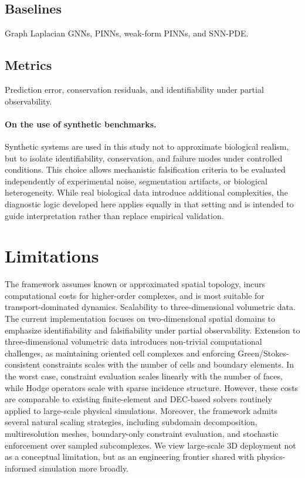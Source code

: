 \documentclass[10pt,article]{article}
\begin{document}
\subsection{Baselines}
Graph Laplacian GNNs, PINNs, weak-form PINNs, and SNN-PDE.

\subsection{Metrics}
Prediction error, conservation residuals, and identifiability under partial observability.

\paragraph{On the use of synthetic benchmarks.}
Synthetic systems are used in this study not to approximate biological realism, but to isolate identifiability, conservation, and failure modes under controlled conditions. This choice allows mechanistic falsification criteria to be evaluated independently of experimental noise, segmentation artifacts, or biological heterogeneity. While real biological data introduce additional complexities, the diagnostic logic developed here applies equally in that setting and is intended to guide interpretation rather than replace empirical validation.
\section{Limitations}

The framework assumes known or approximated spatial topology, incurs computational costs for higher-order complexes, and is most suitable for transport-dominated dynamics.
Scalability to three-dimensional volumetric data.
The current implementation focuses on two-dimensional spatial domains to emphasize identifiability and falsifiability under partial observability. Extension to three-dimensional volumetric data introduces non-trivial computational challenges, as maintaining oriented cell complexes and enforcing Green/Stokes-consistent constraints scales with the number of cells and boundary elements. In the worst case, constraint evaluation scales linearly with the number of faces, while Hodge operators scale with sparse incidence structure. However, these costs are comparable to existing finite-element and DEC-based solvers routinely applied to large-scale physical simulations. Moreover, the framework admits several natural scaling strategies, including subdomain decomposition, multiresolution meshes, boundary-only constraint evaluation, and stochastic enforcement over sampled subcomplexes. We view large-scale 3D deployment not as a conceptual limitation, but as an engineering frontier shared with physics-informed simulation more broadly.
\end{document}
